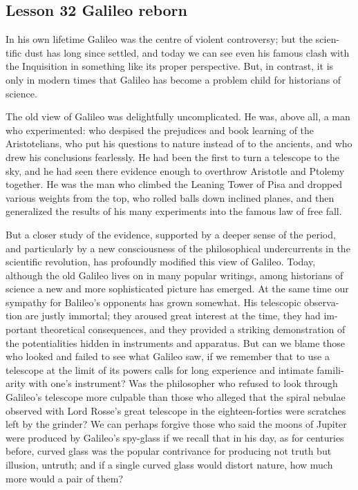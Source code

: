 \documentclass[kindlepaper]{BHCexam4kindle}
\begin{document}
\subsection{Lesson 32
Galileo reborn}
\par
In his own lifetime Galileo was the centre of violent controversy; but the scien-
tific dust has long since settled, and today we can see even his famous clash with
the Inquisition in something like its proper perspective. But, in contrast, it is only
in modern times that Galileo has become a problem child for historians of
science.
\par
The old view of Galileo was delightfully uncomplicated. He was, above all, a
man who experimented: who despised the prejudices and book learning of the
Aristotelians, who put his questions to nature instead of to the ancients, and who
drew his conclusions fearlessly. He had been the first to turn a telescope to the
sky, and he had seen there evidence enough to overthrow Aristotle and Ptolemy
together. He was the man who climbed the Leaning Tower of Pisa and dropped
various weights from the top, who rolled balls down inclined planes, and then
generalized the results of his many experiments into the famous law of free fall.
\par
But a closer study of the evidence, supported by a deeper sense of the period,
and particularly by a new consciousness of the philosophical undercurrents in
the scientific revolution, has profoundly modified this view of Galileo. Today,
although the old Galileo lives on in many popular writings, among historians of
science a new and more sophisticated picture has emerged. At the same time our
sympathy for Balileo's opponents has grown somewhat. His telescopic observa-
tion are justly immortal; they aroused great interest at the time, they had im-
portant theoretical consequences, and they provided a striking demonstration of
the potentialities hidden in instruments and apparatus. But can we blame those
who looked and failed to see what Galileo saw, if we remember that to use a
telescope at the limit of its powers calls for long experience and intimate famili-
arity with one's instrument? Was the philosopher who refused to look through
Galileo's telescope more culpable than those who alleged that the spiral nebulae
observed with Lord Rosse's great telescope in the eighteen-forties were scratches
left by the grinder? We can perhaps forgive those who said the moons of Jupiter
were produced by Galileo's spy-glass if we recall that in his day, as for centuries
before, curved glass was the popular contrivance for producing not truth but
illusion, untruth; and if a single curved glass would distort nature, how much
more would a pair of them?
\clearpage
\end{document}
